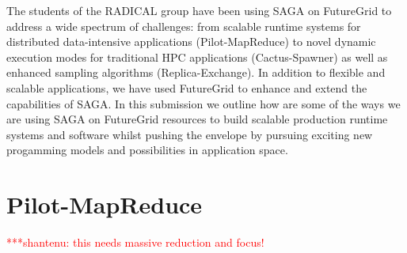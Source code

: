 \documentclass[]{paper}
\newcommand{\jhanote}[1]{ {\textcolor{red} { ***shantenu: #1 }}}
\newcommand{\jhanote}[1]{}
\begin{document}
The students of the RADICAL group have been using SAGA on FutureGrid to address a wide spectrum of challenges: from scalable runtime systems for distributed data-intensive applications (Pilot-MapReduce) to novel dynamic execution modes for traditional HPC applications (Cactus-Spawner) as well as enhanced sampling algorithms (Replica-Exchange).  In addition to flexible and scalable applications, we have used FutureGrid to enhance and extend the capabilities of SAGA.  In this submission we outline how are some of the ways we are using SAGA on FutureGrid resources to build scalable production runtime systems and software whilst pushing the envelope by pursuing exciting new progamming models and possibilities in application space.


\section{Pilot-MapReduce}

\jhanote{this needs massive reduction and focus!}



\end{document}
